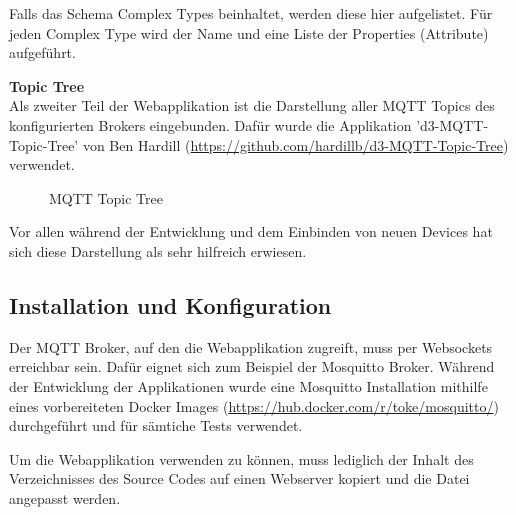 {Falls das Schema Complex Types beinhaltet, werden diese hier aufgelistet. Für jeden Complex Type wird der Name und eine Liste der Properties (Attribute) aufgeführt.

\textbf{Topic Tree} \\
Als zweiter Teil der Webapplikation ist die Darstellung aller MQTT Topics des konfigurierten Brokers eingebunden. Dafür wurde die Applikation 'd3-MQTT-Topic-Tree' von Ben Hardill (\url{https://github.com/hardillb/d3-MQTT-Topic-Tree}) verwendet.

\begin{figure}[H]
	\centering
    \caption{MQTT Topic Tree}
\end{figure}

Vor allen während der Entwicklung und dem Einbinden von neuen Devices hat sich diese Darstellung als sehr hilfreich erwiesen.

\subsection{Installation und Konfiguration}
Der MQTT Broker, auf den die Webapplikation zugreift, muss per Websockets erreichbar sein. Dafür eignet sich zum Beispiel der Mosquitto Broker. Während der Entwicklung der Applikationen wurde eine Mosquitto Installation mithilfe eines vorbereiteten Docker Images (\url{https://hub.docker.com/r/toke/mosquitto/}) durchgeführt und für sämtiche Tests verwendet.

Um die Webapplikation verwenden zu können, muss lediglich der Inhalt des Verzeichnisses \newline  {} des Source Codes auf einen Webserver kopiert und die Datei  angepasst werden.

}

